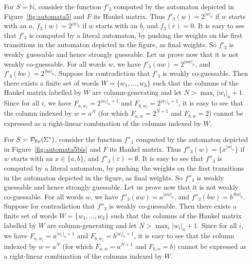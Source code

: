 \documentclass{lmcs}
\numberwithin{theorem}{section}
\begin{document}
	For $S=\mathbb{N}$, consider the function $f'_3$ computed by the automaton depicted in Figure~\ref{fig:automata5} and $F$ its Hankel matrix. Thus $f'_3(w) = 2^{|w|_a}$ if $w$ starts with an $a$, $f_3(w) = 2^{|w|_b}$ if $w$ starts with an $b$, and $f_3(\varepsilon) = 0$. It is easy to see that $f'_3$ is computed by a literal automaton, by pushing the weights on the first transitions in the automaton depicted in the figure, as final weights. So $f'_3$ is weakly guessable and hence strongly guessable. Let us prove now that it is not weakly co-guessable. For all words $w$, we have $f'_3(aw) = 2^{|aw|_a}$, and $f'_3(bw) = 2^{|bw|_b}$. Suppose for contradiction that $f'_3$ is weakly co-guessable. Then there exists a finite set of words $W=\{w_1, \ldots ,w_k\}$ such that the columns of the Hankel matrix labelled by $W$ are column-generating and let $N> \max_i|w_i|_a + 1$. Since for all $i$, we have $F_{a, w_i} = 2^{|w_i|_a + 1}$ and $F_{b, w_i} = 2^{|w_i|_b+1}$, it is easy to see that the column indexed by $w = a^N$ (for which $F_{a, w} = 2^{N+1}$ and $F_{b, w} = 2$) cannot be expressed as a right-linear combination of the columns indexed by $W$.
	
	For $S=\mathcal{P}_{\rm fin}(\Sigma^*)$, consider the function $f''_3$ computed by the automaton depicted in Figure~\ref{fig:automata5bis} and $F$ its Hankel matrix. Thus $f''_3(w) = \{x^{|w|_x}\}$ if $w$ starts with an $x \in \{a,b\}$, and $f''_3(\varepsilon) = \emptyset$. It is easy to see that $f''_3$ is computed by a literal automaton, by pushing the weights on the first transitions in the automaton depicted in the figure, as final weights. So $f''_3$ is weakly guessable and hence strongly guessable. Let us prove now that it is not weakly co-guessable. For all words $w$, we have $f''_3(aw) = a^{|aw|_a}$, and $f''_3(bw) = b^{|bw|_b}$. Suppose for contradiction that $f''_3$ is weakly co-guessable. Then there exists a finite set of words $W=\{w_1, \ldots ,w_k\}$ such that the columns of the Hankel matrix labelled by $W$ are column-generating and let $N> \max_i|w_i|_a + 1$. Since for all $i$, we have $F_{a, w_i} = a^{|w_i|_a + 1}$ and $F_{b, w_i} = b^{|w_i|_b+1}$, it is easy to see that the column indexed by $w = a^N$ (for which $F_{a, w} = a^{N+1}$ and $F_{b, w} = b$) cannot be expressed as a right-linear combination of the columns indexed by $W$.
	
\end{document}
